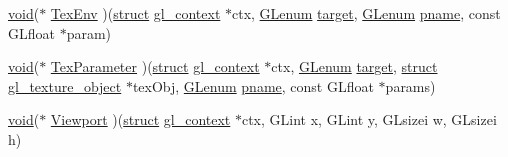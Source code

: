 \begin{Indent}
\begin{DoxyCompactItemize}
\item 
\hyperlink{interfacevoid}{void}($\ast$ \hyperlink{structdd__function__table_a118b549ff1f5cda1b0214062d013f6cd}{Tex\+Env} )(\hyperlink{interfacestruct}{struct} \hyperlink{structgl__context}{gl\+\_\+context} $\ast$ctx, \hyperlink{interfacevoid}{G\+Lenum} \hyperlink{interfacevoid}{target}, \hyperlink{interfacevoid}{G\+Lenum} \hyperlink{interfacevoid}{pname}, const G\+Lfloat $\ast$param)
\item 
\hyperlink{interfacevoid}{void}($\ast$ \hyperlink{structdd__function__table_a970757885239587824ca27aba98bbe95}{Tex\+Parameter} )(\hyperlink{interfacestruct}{struct} \hyperlink{structgl__context}{gl\+\_\+context} $\ast$ctx, \hyperlink{interfacevoid}{G\+Lenum} \hyperlink{interfacevoid}{target}, \hyperlink{interfacestruct}{struct} \hyperlink{structgl__texture__object}{gl\+\_\+texture\+\_\+object} $\ast$tex\+Obj, \hyperlink{interfacevoid}{G\+Lenum} \hyperlink{interfacevoid}{pname}, const G\+Lfloat $\ast$params)
\item 
\hyperlink{interfacevoid}{void}($\ast$ \hyperlink{structdd__function__table_a02346107e5bca25525b75b729b4bac51}{Viewport} )(\hyperlink{interfacestruct}{struct} \hyperlink{structgl__context}{gl\+\_\+context} $\ast$ctx, G\+Lint x, G\+Lint y, G\+Lsizei w, G\+Lsizei h)
\end{DoxyCompactItemize}
\end{Indent}
